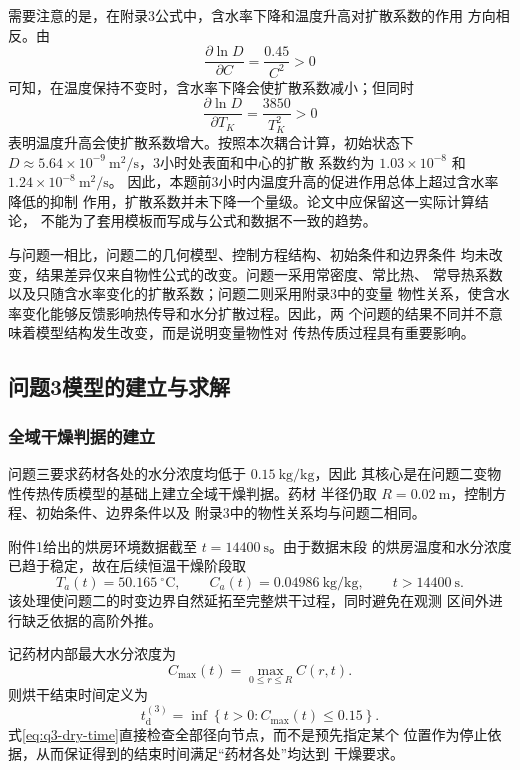 \documentclass[12pt,a4paper]{article}
\renewcommand{\boxed}[1]{#1}
\begin{document}
需要注意的是，在附录3公式中，含水率下降和温度升高对扩散系数的作用
方向相反。由
\begin{equation}
\frac{\partial\ln D}{\partial C}
=
\frac{0.45}{C^2}>0
\end{equation}
可知，在温度保持不变时，含水率下降会使扩散系数减小；但同时
\begin{equation}
\frac{\partial\ln D}{\partial T_K}
=
\frac{3850}{T_K^2}>0
\end{equation}
表明温度升高会使扩散系数增大。按照本次耦合计算，初始状态下
$D\approx5.64\times10^{-9}\ \mathrm{m^2/s}$，3小时处表面和中心的扩散
系数约为 $1.03\times10^{-8}$ 和 $1.24\times10^{-8}\ \mathrm{m^2/s}$。
因此，本题前3小时内温度升高的促进作用总体上超过含水率降低的抑制
作用，扩散系数并未下降一个量级。论文中应保留这一实际计算结论，
不能为了套用模板而写成与公式和数据不一致的趋势。

与问题一相比，问题二的几何模型、控制方程结构、初始条件和边界条件
均未改变，结果差异仅来自物性公式的改变。问题一采用常密度、常比热、
常导热系数以及只随含水率变化的扩散系数；问题二则采用附录3中的变量
物性关系，使含水率变化能够反馈影响热传导和水分扩散过程。因此，两
个问题的结果不同并不意味着模型结构发生改变，而是说明变量物性对
传热传质过程具有重要影响。
\subsection{问题3模型的建立与求解}

\subsubsection{全域干燥判据的建立}

问题三要求药材各处的水分浓度均低于 $0.15\ \mathrm{kg/kg}$，因此
其核心是在问题二变物性传热传质模型的基础上建立全域干燥判据。药材
半径仍取 $R=0.02\ \mathrm{m}$，控制方程、初始条件、边界条件以及
附录3中的物性关系均与问题二相同。

附件1给出的烘房环境数据截至 $t=14400\ \mathrm{s}$。由于数据末段
的烘房温度和水分浓度已趋于稳定，故在后续恒温干燥阶段取
\begin{equation}
T_a(t)=50.165\ ^\circ\mathrm{C},\qquad
C_a(t)=0.04986\ \mathrm{kg/kg},\qquad t>14400\ \mathrm{s}.
\label{eq:q3-environment-extension}
\end{equation}
该处理使问题二的时变边界自然延拓至完整烘干过程，同时避免在观测
区间外进行缺乏依据的高阶外推。

记药材内部最大水分浓度为
\begin{equation}
C_{\max}(t)=\max_{0\leq r\leq R}C(r,t).
\label{eq:q3-cmax}
\end{equation}
则烘干结束时间定义为
\begin{equation}
\boxed{
t_{\mathrm d}^{(3)}
=\inf\left\{t>0:C_{\max}(t)\leq0.15\right\}
}.
\label{eq:q3-dry-time}
\end{equation}
式\eqref{eq:q3-dry-time}直接检查全部径向节点，而不是预先指定某个
位置作为停止依据，从而保证得到的结束时间满足“药材各处”均达到
干燥要求。
\end{document}
